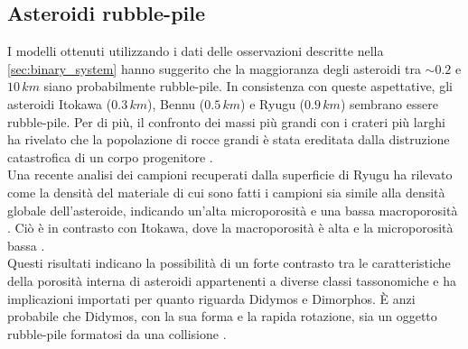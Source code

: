 \documentclass[a4paper,11pt,openright]{book}
\begin{document}
\subsection{Asteroidi rubble-pile}
I modelli ottenuti utilizzando i dati delle osservazioni descritte nella \cref{sec:binary_system} hanno suggerito che la maggioranza degli asteroidi tra $\sim 0.2$ e $10\,km$ siano probabilmente rubble-pile. In consistenza con queste aspettative, gli asteroidi Itokawa ($0.3\,km$), Bennu ($0.5\,km$) e Ryugu ($0.9\,km$) sembrano essere rubble-pile. Per di più, il confronto dei massi più grandi con i crateri più larghi ha rivelato che la popolazione di rocce grandi è stata ereditata dalla distruzione catastrofica di un corpo progenitore \citep{DellaGiustina2019}.\\
Una recente analisi dei campioni recuperati dalla superficie di Ryugu ha rilevato come la densità del materiale di cui sono fatti i campioni sia simile alla densità globale dell'asteroide, indicando un'alta microporosità e una bassa macroporosità \citep{pilorget_first_2021}. Ciò è in contrasto con Itokawa, dove la macroporosità è alta e la microporosità bassa \citep{tsuchiyama_three-dimensional_2014}.\\
Questi risultati indicano la possibilità di un forte contrasto tra le caratteristiche della porosità interna di asteroidi appartenenti a diverse classi tassonomiche e ha implicazioni importati per quanto riguarda Didymos e Dimorphos. È anzi probabile che Didymos, con la sua forma e la rapida rotazione, sia un oggetto rubble-pile formatosi da una collisione \citep{zhang_creep_2021}. %
\end{document}
